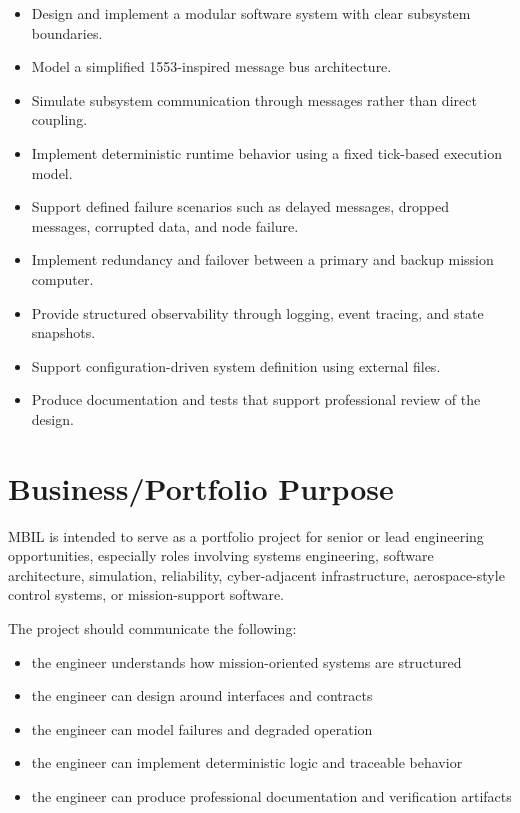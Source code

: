 \documentclass[12pt]{article}
\begin{document}
\begin{itemize}[leftmargin=*]
    \item Design and implement a modular software system with clear subsystem boundaries.
    \item Model a simplified 1553-inspired message bus architecture.
    \item Simulate subsystem communication through messages rather than direct coupling.
    \item Implement deterministic runtime behavior using a fixed tick-based execution model.
    \item Support defined failure scenarios such as delayed messages, dropped messages, corrupted data, and node failure.
    \item Implement redundancy and failover between a primary and backup mission computer.
    \item Provide structured observability through logging, event tracing, and state snapshots.
    \item Support configuration-driven system definition using external files.
    \item Produce documentation and tests that support professional review of the design.
\end{itemize}

\section{Business/Portfolio Purpose}
MBIL is intended to serve as a portfolio project for senior or lead engineering opportunities, especially roles involving systems engineering, software architecture, simulation, reliability, cyber-adjacent infrastructure, aerospace-style control systems, or mission-support software.

The project should communicate the following:

\begin{itemize}[leftmargin=*]
    \item the engineer understands how mission-oriented systems are structured
    \item the engineer can design around interfaces and contracts
    \item the engineer can model failures and degraded operation
    \item the engineer can implement deterministic logic and traceable behavior
    \item the engineer can produce professional documentation and verification artifacts
\end{itemize}
\end{document}

